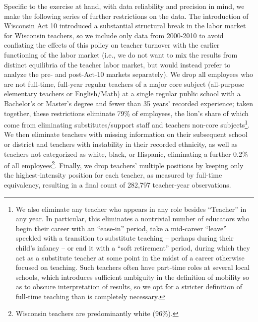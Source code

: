 \documentclass[12pt,]{article}
\let\rmarkdownfootnote\footnote%
\def\footnote{\protect\rmarkdownfootnote}
\begin{document}
Specific to the exercise at hand, with data reliability and precision in
mind, we make the following series of further restrictions on the data.
The introduction of Wisconsin Act 10 introduced a substantial structural
break in the labor market for Wisconsin teachers, so we include only
data from 2000-2010 to avoid conflating the effects of this policy on
teacher turnover with the earlier functioning of the labor market (i.e.,
we do not want to mix the results from distinct equilibria of the
teacher labor market, but would instead prefer to analyze the pre- and
post-Act-10 markets separately). We drop all employees who are not
full-time, full-year regular teachers of a major core subject
(all-purpose elementary teachers or English/Math) at a single regular
public school with a Bachelor's or Master's degree and fewer than 35
years' recorded experience; taken together, these restrictions eliminate
79\% of employees, the lion's share of which come from eliminating
substitutes/support staff and teachers non-core subjects\footnote{\label{ftn:pos_code}We
  also eliminate any teacher who appears in any role besides ``Teacher''
  in any year. In particular, this eliminates a nontrivial number of
  educators who begin their career with an ``ease-in'' period, take a
  mid-career ``leave'' speckled with a transition to substitute teaching
  -- perhaps during their child's infancy -- or end it with a ``soft
  retirement'' period, during which they act as a substitute teacher at
  some point in the midst of a career otherwise focused on teaching.
  Such teachers often have part-time roles at several local schools,
  which introduces sufficient ambiguity in the definition of mobility so
  as to obscure interpretation of results, so we opt for a stricter
  definition of full-time teaching than is completely necessary.}. We
then eliminate teachers with missing information on their subsequent
school or district and teachers with instability in their recorded
ethnicity, as well as teachers not categorized as white, black, or
Hispanic, eliminating a further 0.2\% of all employees\footnote{Wisconsin
  teachers are predominantly white (96\%).}. Finally, we drop teachers'
multiple positions by keeping only the highest-intensity position for
each teacher, as measured by full-time equivalency, resulting in a final
count of 282,797 teacher-year observations.
\end{document}
